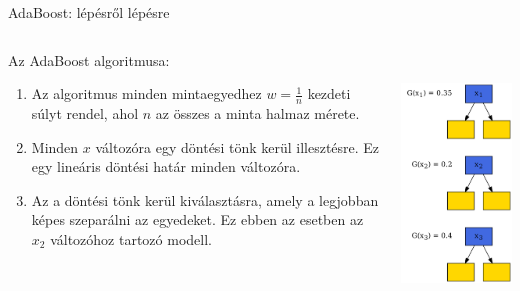 \documentclass[english, aspectratio=169]{beamer}
\begin{document}
\begin{frame}{AdaBoost: lépésről lépésre}
\begin{columns}
\begin{column}{.5\textwidth}
Az AdaBoost algoritmusa:
\begin{enumerate}
	\item Az algoritmus minden mintaegyedhez $w=\frac{1}{n}$ kezdeti súlyt rendel, ahol $n$ az összes a minta halmaz mérete.
	\item Minden $x$ változóra egy döntési tönk kerül illesztésre. Ez egy lineáris döntési határ minden változóra. 
	\item Az a döntési tönk kerül kiválasztásra, amely a legjobban képes szeparálni az egyedeket. Ez ebben az esetben az $x_2$ változóhoz tartozó modell. 
\end{enumerate}
\end{column}
\begin{column}{.5\textwidth}
\begin{center}
\includegraphics[width=7cm, height=7cm, keepaspectratio]{graphs/ensemble_1.png}
\end{center}
\end{column}
\end{columns}
\end{frame}
\end{document}
